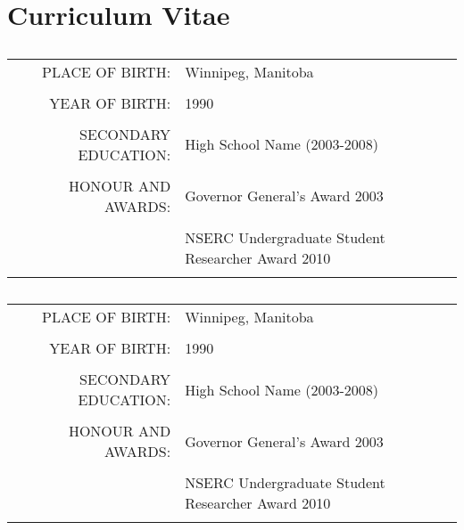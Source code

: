 
\chapter[Curriculum Vitae]{Curriculum Vitae}
\label{appendix:vitae}

\section*{\centering \StudentNameA}
\begin{table}[htdp]
\begin{center}
\begin{tabular}{rl}
	PLACE OF BIRTH: 
		& Winnipeg, Manitoba\\ \\
	YEAR OF BIRTH: 
		& 1990 \\ \\
	SECONDARY EDUCATION: 
		& High School Name (2003-2008) \\ \\
	HONOUR AND AWARDS: 
		& Governor General's Award 2003 \\ \\
		& NSERC Undergraduate Student Researcher Award 2010 \\ \\
\end{tabular}
\end{center}
\end{table}
\newpage 

\section*{\centering \StudentNameB}
\begin{table}[htdp]
\begin{center}
\begin{tabular}{rl}
	PLACE OF BIRTH: 
		& Winnipeg, Manitoba\\ \\
	YEAR OF BIRTH: 
		& 1990 \\ \\
	SECONDARY EDUCATION: 
		& High School Name (2003-2008) \\ \\
	HONOUR AND AWARDS: 
		& Governor General's Award 2003 \\ \\
		& NSERC Undergraduate Student Researcher Award 2010 \\ \\
\end{tabular}
\end{center}
\end{table}
\newpage

